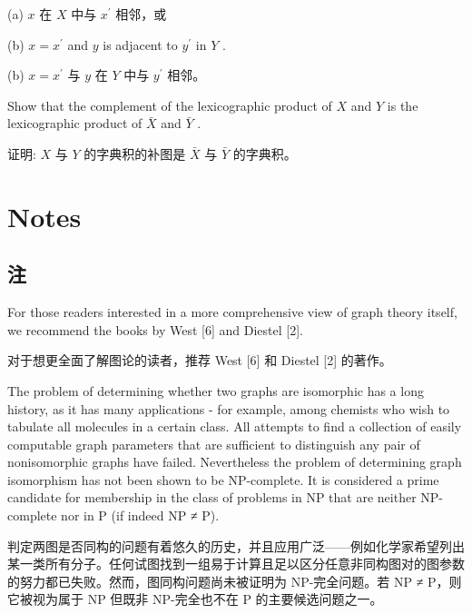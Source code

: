 \documentclass[10pt]{article}
\begin{document}
\begin{tcolorbox}\relax
(a) \(x\) 在 \(X\) 中与 \({x}^{\prime }\) 相邻，或
\end{tcolorbox}

(b) \(x = {x}^{\prime }\) and \(y\) is adjacent to \({y}^{\prime }\) in \(Y\) .

\begin{tcolorbox}\relax
(b) \(x = {x}^{\prime }\) 与 \(y\) 在 \(Y\) 中与 \({y}^{\prime }\) 相邻。
\end{tcolorbox}

Show that the complement of the lexicographic product of \(X\) and \(Y\) is the lexicographic product of \(\bar{X}\) and \(\bar{Y}\) .

\begin{tcolorbox}\relax
证明: \(X\) 与 \(Y\) 的字典积的补图是 \(\bar{X}\) 与 \(\bar{Y}\) 的字典积。
\end{tcolorbox}

\section*{Notes}

\begin{tcolorbox}\relax
\section*{注}
\end{tcolorbox}

For those readers interested in a more comprehensive view of graph theory itself, we recommend the books by West [6] and Diestel [2].

\begin{tcolorbox}\relax
对于想更全面了解图论的读者，推荐 West [6] 和 Diestel [2] 的著作。
\end{tcolorbox}

The problem of determining whether two graphs are isomorphic has a long history, as it has many applications - for example, among chemists who wish to tabulate all molecules in a certain class. All attempts to find a collection of easily computable graph parameters that are sufficient to distinguish any pair of nonisomorphic graphs have failed. Nevertheless the problem of determining graph isomorphism has not been shown to be NP-complete. It is considered a prime candidate for membership in the class of problems in NP that are neither NP-complete nor in P (if indeed NP ≠ P).

\begin{tcolorbox}\relax
判定两图是否同构的问题有着悠久的历史，并且应用广泛——例如化学家希望列出某一类所有分子。任何试图找到一组易于计算且足以区分任意非同构图对的图参数的努力都已失败。然而，图同构问题尚未被证明为 NP-完全问题。若 NP ≠ P，则它被视为属于 NP 但既非 NP-完全也不在 P 的主要候选问题之一。
\end{tcolorbox}
\end{document}
